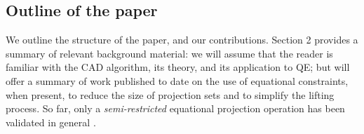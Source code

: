 \documentclass{article}
\newtheorem{example}{Example}
\begin{document}





\subsection{Outline of the paper}

We outline the structure of the paper, and our contributions.
Section 2 provides a summary of relevant background material: we will assume that the reader is familiar with the CAD algorithm, its theory, and its application to QE; but will offer a summary of work published to date on the use of equational constraints, when present, to reduce the size of projection sets and to simplify the lifting process. So far, only a {\em semi-restricted} equational projection operation has been validated in general \cite{McCallum2001, EBD2020}. 
\end{document}
